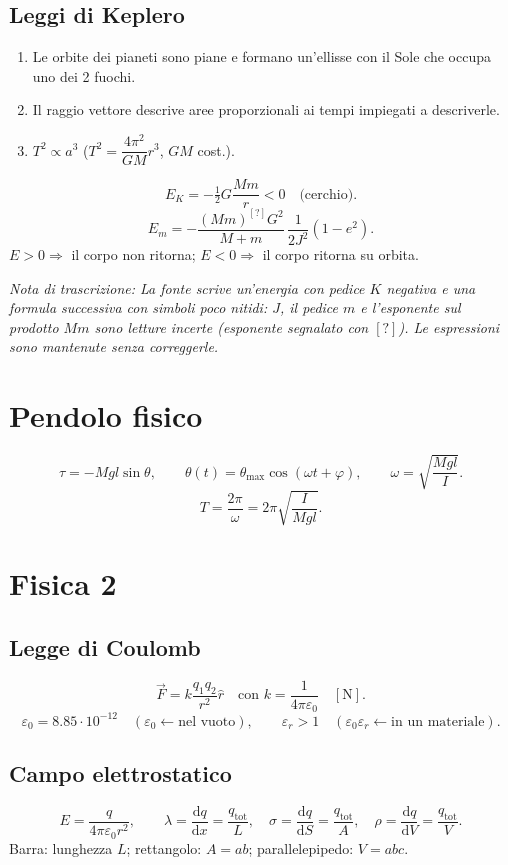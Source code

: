 \documentclass[a4paper,11pt]{article}
\newcommand{\orig}[1]{\clearpage}
\newcommand{\nota}[1]{\par\small\textit{Nota di trascrizione: #1}\par\normalsize}
\newcommand{\vv}[1]{\vec{#1}}
\newcommand{\dd}{\mathrm{d}}
\begin{document}
\subsection*{Leggi di Keplero}
\begin{enumerate}\item Le orbite dei pianeti sono piane e formano un'ellisse con il Sole che occupa uno dei 2 fuochi.
\item Il raggio vettore descrive aree proporzionali ai tempi impiegati a descriverle.
\item $T^2\propto a^3$ ($T^2=\dfrac{4\pi^2}{GM}r^3$, $GM$ cost.).\end{enumerate}
\[E_K=-\tfrac12G\frac{Mm}{r}<0\quad\text{(cerchio)}.\]
\[E_m=-\frac{(Mm)^{[?]}G^2}{M+m}\,\frac{1}{2J^2}(1-e^2).\]
$E>0\Rightarrow$ il corpo non ritorna; $E<0\Rightarrow$ il corpo ritorna su orbita.
\nota{La fonte scrive un'energia con pedice $K$ negativa e una formula successiva con simboli poco nitidi: $J$, il pedice $m$ e l'esponente sul prodotto $Mm$ sono letture incerte (esponente segnalato con $[?]$). Le espressioni sono mantenute senza correggerle.}
\orig{8}\section*{Pendolo fisico}
\[\tau=-Mgl\sin\theta,\qquad \theta(t)=\theta_{\max}\cos(\omega t+\varphi),\qquad \omega=\sqrt{\frac{Mgl}{I}}.\]
\[T=\frac{2\pi}{\omega}=2\pi\sqrt{\frac{I}{Mgl}}.\]
\section*{Fisica 2}\subsection*{Legge di Coulomb}
\[\vv F=k\frac{q_1q_2}{r^2}\hat r\quad\text{con }k=\frac1{4\pi\varepsilon_0}\quad[\mathrm N].\]
\[\varepsilon_0=8.85\cdot10^{-12}\quad(\varepsilon_0\leftarrow\text{nel vuoto}),\qquad \varepsilon_r>1\quad(\varepsilon_0\varepsilon_r\leftarrow\text{in un materiale}).\]
\subsection*{Campo elettrostatico}
\[E=\frac q{4\pi\varepsilon_0r^2},\qquad
\lambda=\frac{\dd q}{\dd x}=\frac{q_{\mathrm{tot}}}{L},\quad
\sigma=\frac{\dd q}{\dd S}=\frac{q_{\mathrm{tot}}}{A},\quad
\rho=\frac{\dd q}{\dd V}=\frac{q_{\mathrm{tot}}}{V}.\]
Barra: lunghezza $L$; rettangolo: $A=ab$; parallelepipedo: $V=abc$.
\begin{center}\end{center}
\end{document}
